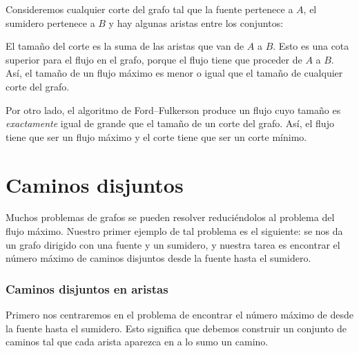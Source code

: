 Consideremos cualquier corte del grafo
tal que la fuente pertenece a $A$,
el sumidero pertenece a $B$
y hay algunas aristas entre los conjuntos:

\begin{center}
\end{center}

El tamaño del corte es la suma de las aristas
que van de $A$ a $B$.
Esto es una cota superior para el flujo
en el grafo, porque el flujo tiene que proceder
de $A$ a $B$.
Así, el tamaño de un flujo máximo es menor o igual que
el tamaño de cualquier corte del grafo.

Por otro lado, el algoritmo de Ford–Fulkerson
produce un flujo cuyo tamaño es \emph{exactamente} igual de grande
que el tamaño de un corte del grafo.
Así, el flujo tiene que ser un flujo máximo
y el corte tiene que ser un corte mínimo.

\section{Caminos disjuntos}

Muchos problemas de grafos se pueden resolver reduciéndolos
al problema del flujo máximo.
Nuestro primer ejemplo de tal problema es
el siguiente: se nos da un grafo dirigido
con una fuente y un sumidero,
y nuestra tarea es encontrar el número máximo
de caminos disjuntos desde la fuente hasta el sumidero.

\subsubsection{Caminos disjuntos en aristas}

Primero nos centraremos en el problema de
encontrar el número máximo de
 desde la fuente hasta el sumidero.
Esto significa que debemos construir un conjunto de caminos
tal que cada arista aparezca en a lo sumo un camino.

